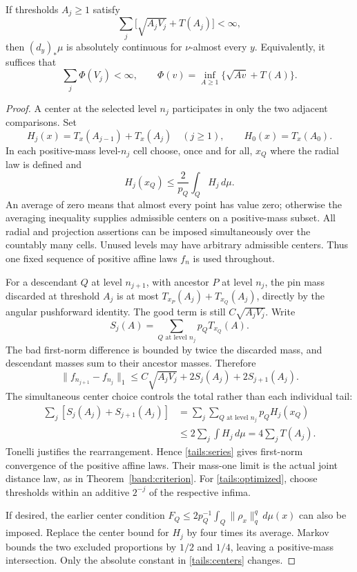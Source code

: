 \begin{proposition}
\label{tails:criterion}
If thresholds \(A_j\geq1\) satisfy
\begin{equation}\label{tails:series}
\sum_j\bigl[\sqrt{A_jV_j}+T(A_j)\bigr]<\infty,
\end{equation}
then \((d_y)_*\mu\) is absolutely continuous for
\(\nu\)-almost every \(y\). Equivalently, it suffices that
\begin{equation}\label{tails:optimized}
\sum_j\Phi(V_j)<\infty,
\qquad
\Phi(v)=\inf_{A\geq1}\{\sqrt{Av}+T(A)\}.
\end{equation}
\end{proposition}
\begin{proof}
A center at the selected level \(n_j\) participates in only the two
adjacent comparisons. Set
$$
H_j(x)=T_x(A_{j-1})+T_x(A_j)\quad(j\geq1),
\qquad H_0(x)=T_x(A_0).
$$
In each positive-mass level-\(n_j\) cell choose, once and for all,
\(x_Q\) where the radial law is defined and
$$
H_j(x_Q)\leq \frac2{p_Q}\int_Q H_j\,d\mu.
$$
An average of zero means that almost every point has value zero;
otherwise the averaging inequality supplies admissible centers on a
positive-mass subset. All radial and projection assertions can be
imposed simultaneously over the countably many cells. Unused levels
may have arbitrary admissible centers. Thus one fixed sequence of
positive affine laws \(f_n\) is used throughout.

For a descendant \(Q\) at level \(n_{j+1}\), with ancestor \(P\)
at level \(n_j\), the pin mass discarded at threshold \(A_j\) is at
most \(T_{x_P}(A_j)+T_{x_Q}(A_j)\), directly by the angular
pushforward identity. The good term is still
\(C\sqrt{A_jV_j}\). Write
$$
S_j(A)=\sum_{Q\text{ at level }n_j}p_QT_{x_Q}(A).
$$
The bad first-norm difference is bounded by twice the discarded mass,
and descendant masses sum to their ancestor masses. Therefore
$$
\|f_{n_{j+1}}-f_{n_j}\|_1
\leq C\sqrt{A_jV_j}+2S_j(A_j)+2S_{j+1}(A_j).
$$
The simultaneous center choice controls the total rather than each
individual tail:
\begin{equation}\label{tails:centers}
\begin{aligned}
\sum_j[S_j(A_j)+S_{j+1}(A_j)]
&=\sum_j\sum_{Q\text{ at level }n_j}p_QH_j(x_Q)\\
&\leq2\sum_j\int H_j\,d\mu
=4\sum_jT(A_j).
\end{aligned}
\end{equation}
Tonelli justifies the rearrangement. Hence \eqref{tails:series} gives
first-norm convergence of the positive affine laws. Their mass-one
limit is the actual joint distance law, as in
Theorem~\ref{band:criterion}. For \eqref{tails:optimized}, choose
thresholds within an additive \(2^{-j}\) of the respective infima.

If desired, the earlier center condition
\(F_Q\leq2p_Q^{-1}\int_Q\|\rho_x\|_q^q\,d\mu(x)\)
can also be imposed. Replace the center bound for \(H_j\) by four
times its average. Markov bounds the two excluded proportions by
\(1/2\) and \(1/4\), leaving a positive-mass intersection. Only
the absolute constant in \eqref{tails:centers} changes.
\end{proof}

